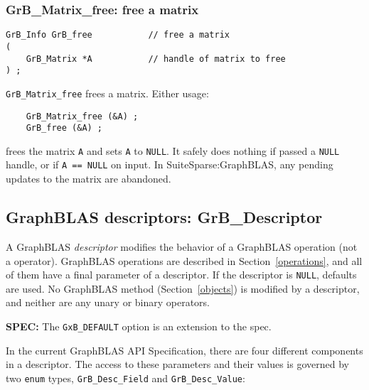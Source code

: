 \documentclass[12pt]{article}
\begin{document}
\subsubsection{{\sf GrB\_Matrix\_free:} free a matrix}
\label{matrix_free}

\begin{mdframed}[userdefinedwidth=6in]
{\footnotesize
\begin{verbatim}
GrB_Info GrB_free           // free a matrix
(
    GrB_Matrix *A           // handle of matrix to free
) ;
\end{verbatim} } \end{mdframed}

\verb'GrB_Matrix_free' frees a matrix.  Either usage:

    {\small
    \begin{verbatim}
    GrB_Matrix_free (&A) ;
    GrB_free (&A) ; \end{verbatim}}

\noindent
frees the matrix \verb'A' and sets \verb'A' to \verb'NULL'.  It safely does
nothing if passed a \verb'NULL' handle, or if \verb'A == NULL' on input.
In SuiteSparse:GraphBLAS, any pending updates to the matrix are abandoned.

\newpage
\subsection{GraphBLAS descriptors: {\sf GrB\_Descriptor}} %
\label{descriptor}

A GraphBLAS {\em descriptor} modifies the behavior of a GraphBLAS operation
(not a operator).  GraphBLAS operations are described in
Section~\ref{operations}, and all of them have a final parameter of a
descriptor.  If the descriptor is \verb'NULL', defaults are used.  No GraphBLAS
method (Section~\ref{objects}) is modified by a descriptor, and neither are any
unary or binary operators.

\begin{spec}
{\bf SPEC:} The \verb'GxB_DEFAULT' option is an extension to the spec.
\end{spec}

In the current GraphBLAS API Specification, there are four different components
in a descriptor.  The access to these parameters and their values is governed
by two \verb'enum' types, \verb'GrB_Desc_Field' and \verb'GrB_Desc_Value':
\end{document}
